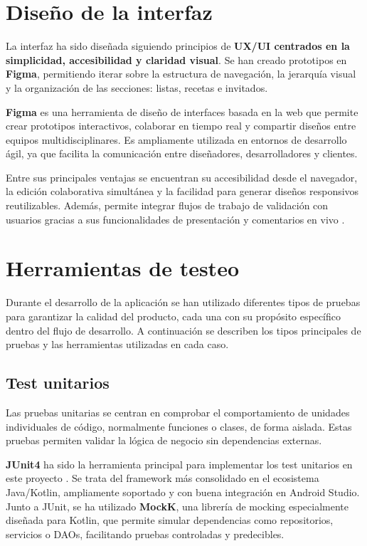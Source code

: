 \section{Diseño de la interfaz}

La interfaz ha sido diseñada siguiendo principios de \textbf{UX/UI centrados en la simplicidad, accesibilidad y claridad visual}. Se han creado prototipos en \textbf{Figma}, permitiendo iterar sobre la estructura de navegación, la jerarquía visual y la organización de las secciones: listas, recetas e invitados.

\textbf{Figma} es una herramienta de diseño de interfaces basada en la web que permite crear prototipos interactivos, colaborar en tiempo real y compartir diseños entre equipos multidisciplinares. Es ampliamente utilizada en entornos de desarrollo ágil, ya que facilita la comunicación entre diseñadores, desarrolladores y clientes.

Entre sus principales ventajas se encuentran su accesibilidad desde el navegador, la edición colaborativa simultánea y la facilidad para generar diseños responsivos reutilizables. Además, permite integrar flujos de trabajo de validación con usuarios gracias a sus funcionalidades de presentación y comentarios en vivo \cite{figma}.

\section{Herramientas de testeo}


Durante el desarrollo de la aplicación se han utilizado diferentes tipos de pruebas para garantizar la calidad del producto, cada una con su propósito específico dentro del flujo de desarrollo. A continuación se describen los tipos principales de pruebas y las herramientas utilizadas en cada caso.

\subsection{Test unitarios}

Las pruebas unitarias se centran en comprobar el comportamiento de unidades individuales de código, normalmente funciones o clases, de forma aislada. Estas pruebas permiten validar la lógica de negocio sin dependencias externas.

\textbf{JUnit4} ha sido la herramienta principal para implementar los test unitarios en este proyecto \cite{android-testing}. Se trata del framework más consolidado en el ecosistema Java/Kotlin, ampliamente soportado y con buena integración en Android Studio. Junto a JUnit, se ha utilizado \textbf{MockK}, una librería de mocking especialmente diseñada para Kotlin, que permite simular dependencias como repositorios, servicios o DAOs, facilitando pruebas controladas y predecibles.

